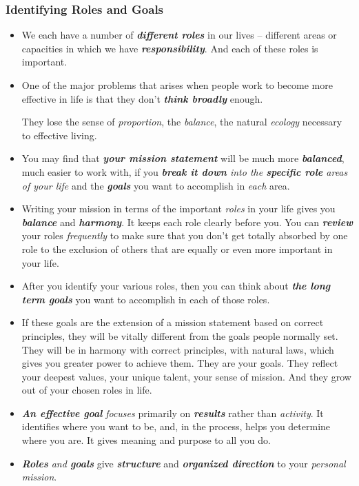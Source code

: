 \documentclass[11pt]{article}
\begin{document}
\subsubsection{Identifying Roles and Goals}
\begin{itemize}
\item We each have a number of \emph{\textbf{different roles}} in our lives -- different areas or capacities in which we have \emph{\textbf{responsibility}}. And each of these roles is important.

\item One of the major problems that arises when people work to become more effective in life is that they don't \emph{\textbf{think broadly}} enough. 

They lose the sense of \emph{proportion}, the \emph{balance}, the natural \emph{ecology} necessary to effective living.

\item You may find that \emph{\textbf{your mission statement}} will be much more \emph{\textbf{balanced}}, much easier to work with, if you \emph{\textbf{break it down} into the \textbf{specific role} areas of your life} and the \emph{\textbf{goals}} you want to accomplish in \emph{each}
area. 

\item Writing your mission in terms of the important \emph{roles} in your life gives you \emph{\textbf{balance}} and \emph{\textbf{harmony}}. It keeps each role clearly before you. You can \emph{\textbf{review}} your roles \emph{frequently} to make sure that you don't get totally absorbed by one role to the exclusion of others that are equally or even more important in your life.

\item After you identify your various roles, then you can think about \emph{\textbf{the long term goals}} you want to accomplish in each of those roles. 

\item If these goals are the extension of a mission statement based on correct principles, they will be vitally different from the goals people normally set. They will be in
harmony with correct principles, with natural laws, which gives you greater power to achieve them. They are your goals. They reflect your deepest
values, your unique talent, your sense of mission. And they grow out of your chosen roles in life.

\item \emph{\textbf{An effective goal}} \emph{focuses} primarily on \emph{\textbf{results}} rather than \emph{activity}. It identifies where you want to
be, and, in the process, helps you determine where you are. It gives meaning and purpose to all you do.

\item \textit{\textbf{Roles} and \textbf{goals}} give \emph{\textbf{structure}} and \emph{\textbf{organized direction}} to your \emph{personal mission}.
\end{itemize}
\end{document}
